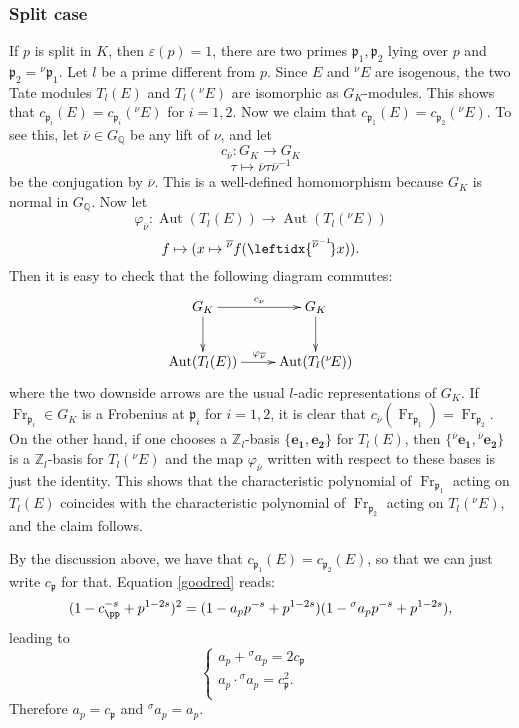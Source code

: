 \documentclass[11pt]{amsart}
\theoremstyle{definition}
\begin{document}
	  \subsubsection*{Split case}
	  If $p$ is split in $K$, then $\varepsilon(p)=1$, there are two primes ${\mathfrak{p}}_1,{\mathfrak{p}}_2$ lying over $p$ and ${\mathfrak{p}}_2={}^{\nu}{\mathfrak{p}}_1$. Let $l$ be a prime different from $p$. Since $E$ and ${{}^\nu\!} E$ are isogenous, the two Tate modules $T_l(E)$ and $T_l({{}^\nu\!} E)$ are isomorphic as $G_K$-modules. This shows that $c_{{\mathfrak{p}}_i}(E)=c_{{\mathfrak{p}}_i}({{}^\nu\!} E)$ for $i=1,2$. Now we claim that $c_{{\mathfrak{p}}_1}(E)=c_{{\mathfrak{p}}_2}({{}^\nu\!} E)$. To see this, let $\overline{\nu}\in {G_{\mathbb{Q}}}$ be any lift of $\nu$, and let
	  $$c_{\overline{\nu}}\colon G_K\to G_K$$
	  $$\tau\mapsto \overline{\nu}\tau\overline{\nu}^{-1}$$
	  be the conjugation by $\overline{\nu}$. This is a well-defined homomorphism because $G_K$ is normal in ${G_{\mathbb{Q}}}$.
	  Now let
		$$\varphi_{\overline{\nu}}\colon \operatorname{Aut}(T_l(E))\to \operatorname{Aut}(T_l({{}^\nu\!} E))$$
		$$f\mapsto (x\mapsto {}^{\overline{\nu}}f(\leftidx{^{\overline{\nu}^{-1}}\!}x)).$$
	Then it is easy to check that the following diagram commutes:
	  $$\begin{xymatrix}{
			   G_K\ar[r]^{c_{\nu}}\ar[d] & G_K \ar[d]\\
				\operatorname{Aut}(T_l(E))\ar[r]^{\varphi_{\overline{\nu}}} & \operatorname{Aut}(T_l({{}^\nu\!} E))
			  }\end{xymatrix}$$
	where the two downside arrows are the usual $l$-adic representations of $G_K$. If $\operatorname{Fr}_{{\mathfrak{p}}_i}\in G_K$ is a Frobenius at ${\mathfrak{p}}_i$ for $i=1,2$, it is clear that $c_{\overline{\nu}}(\operatorname{Fr}_{{\mathfrak{p}}_1})=\operatorname{Fr}_{{\mathfrak{p}}_2}$. On the other hand, if one chooses a ${\mathbb{Z}}_l$-basis $\{\mathbf{e_1},\mathbf{e_2}\}$ for $T_l(E)$, then $\{{}^{\overline{\nu}\!}\mathbf{e_1},{}^{\overline{\nu}\!}\mathbf{e_2}\}$ is a ${\mathbb{Z}}_l$-basis for $T_l({{}^\nu\!} E)$ and the map $\varphi_{\overline{\nu}}$ written with respect to these bases is just the identity. This shows that the characteristic polynomial of $\operatorname{Fr}_{{\mathfrak{p}}_1}$ acting on $T_l(E)$ coincides with the characteristic polynomial of $\operatorname{Fr}_{{\mathfrak{p}}_2}$ acting on $T_l({{}^\nu\!} E)$, and the claim follows.

	 By the discussion above, we have that $c_{{\mathfrak{p}}_1}(E)=c_{{\mathfrak{p}}_2}(E)$, so that we can just write $c_{\mathfrak{p}}$ for that. Equation \eqref{goodred} reads:
	  $$(1-c_\pp^{-s}+p^{1-2s})^2=(1-a_pp^{-s}+p^{1-2s})(1-{}^{\sigma}a_pp^{-s}+p^{1-2s}),$$
	  leading to
	  $$\begin{cases}
      a_p+{}^{\sigma}a_p=2c_{\mathfrak{p}} & \\
      a_p\cdot {{}^\sigma\!} a_p=c_{\mathfrak{p}}^2. & \\
	\end{cases}$$
	  Therefore $a_p=c_{\mathfrak{p}}$ and ${{}^\sigma\!} a_p=a_p$.
\end{document}
